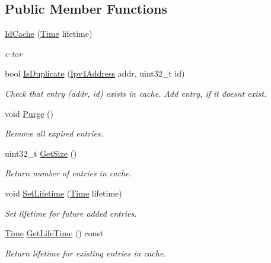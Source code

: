 \subsection*{Public Member Functions}
\begin{DoxyCompactItemize}
\item 
\hyperlink{classns3_1_1aodv_1_1IdCache_aed0e04abc83d64133ae44336a66b4de0}{Id\+Cache} (\hyperlink{classns3_1_1Time}{Time} lifetime)
\begin{DoxyCompactList}\small\item\em c-\/tor \end{DoxyCompactList}\item 
bool \hyperlink{classns3_1_1aodv_1_1IdCache_a6f32458e4f47ab3d977d8c81742b172c}{Is\+Duplicate} (\hyperlink{classns3_1_1Ipv4Address}{Ipv4\+Address} addr, uint32\+\_\+t id)
\begin{DoxyCompactList}\small\item\em Check that entry (addr, id) exists in cache. Add entry, if it doesn\textquotesingle{}t exist. \end{DoxyCompactList}\item 
void \hyperlink{classns3_1_1aodv_1_1IdCache_a1f483148a0a0b5bc3a3fefb231af9635}{Purge} ()
\begin{DoxyCompactList}\small\item\em Remove all expired entries. \end{DoxyCompactList}\item 
uint32\+\_\+t \hyperlink{classns3_1_1aodv_1_1IdCache_ab215d93f7cb2d43001274bf88924df4b}{Get\+Size} ()
\begin{DoxyCompactList}\small\item\em Return number of entries in cache. \end{DoxyCompactList}\item 
void \hyperlink{classns3_1_1aodv_1_1IdCache_a39a2377540292d98cfa29b2db6cb7cd9}{Set\+Lifetime} (\hyperlink{classns3_1_1Time}{Time} lifetime)
\begin{DoxyCompactList}\small\item\em Set lifetime for future added entries. \end{DoxyCompactList}\item 
\hyperlink{classns3_1_1Time}{Time} \hyperlink{classns3_1_1aodv_1_1IdCache_a64cdd0f5ea3c40546a0c6002fd1974d9}{Get\+Life\+Time} () const 
\begin{DoxyCompactList}\small\item\em Return lifetime for existing entries in cache. \end{DoxyCompactList}\end{DoxyCompactItemize}
